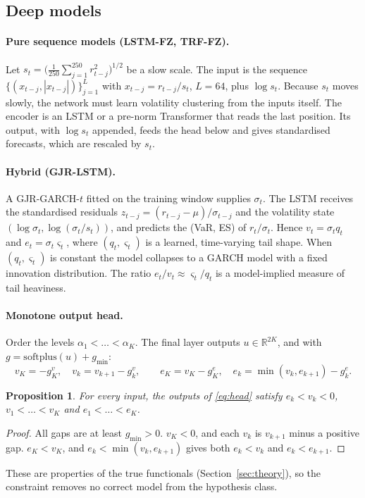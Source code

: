 \documentclass[11pt]{article}
\newtheorem{proposition}{Proposition}
\theoremstyle{remark}
\newcommand{\1}{\mathbf{1}}
\begin{document}
\subsection{Deep models}\label{sec:deep}
\paragraph{Pure sequence models (LSTM-FZ, TRF-FZ).} Let $s_t=\bigl(\frac{1}{250}\sum_{j=1}^{250}r_{t-j}^2\bigr)^{1/2}$ be a slow scale. The input is the sequence $\{(x_{t-j},|x_{t-j}|)\}_{j=1}^{L}$ with $x_{t-j}=r_{t-j}/s_t$, $L=64$, plus $\log s_t$. Because $s_t$ moves slowly, the network must learn volatility clustering from the inputs itself. The encoder is an LSTM \citep{hochreiter1997long} or a pre-norm Transformer \citep{vaswani2017attention} that reads the last position. Its output, with $\log s_t$ appended, feeds the head below and gives standardised forecasts, which are rescaled by $s_t$.

\paragraph{Hybrid (GJR-LSTM).} A GJR-GARCH-$t$ fitted on the training window supplies $\sigma_t$. The LSTM receives the standardised residuals $z_{t-j}=(r_{t-j}-\mu)/\sigma_{t-j}$ and the volatility state $(\log\sigma_t,\log(\sigma_t/s_t))$, and predicts the (VaR, ES) of $r_t/\sigma_t$. Hence $v_t=\sigma_tq_t$ and $e_t=\sigma_t\varsigma_t$, where $(q_t,\varsigma_t)$ is a learned, time-varying tail shape. When $(q_t,\varsigma_t)$ is constant the model collapses to a GARCH model with a fixed innovation distribution. The ratio $e_t/v_t\approx\varsigma_t/q_t$ is a model-implied measure of tail heaviness.

\paragraph{Monotone output head.} Order the levels $\alpha_1<\dots<\alpha_K$. The final layer outputs $u\in\mathbb{R}^{2K}$, and with $g=\mathrm{softplus}(u)+g_{\min}$:
\begin{equation}\label{eq:head}
v_K=-g^v_K,\quad v_k=v_{k+1}-g^v_k,\qquad e_K=v_K-g^e_K,\quad e_k=\min(v_k,e_{k+1})-g^e_k .
\end{equation}
\begin{proposition}\label{prop:head}
For every input, the outputs of \eqref{eq:head} satisfy $e_k<v_k<0$, $v_1<\dots<v_K$ and $e_1<\dots<e_K$.
\end{proposition}
\begin{proof}
All gaps are at least $g_{\min}>0$. $v_K<0$, and each $v_k$ is $v_{k+1}$ minus a positive gap. $e_K<v_K$, and $e_k<\min(v_k,e_{k+1})$ gives both $e_k<v_k$ and $e_k<e_{k+1}$.
\end{proof}
These are properties of the true functionals (Section~\ref{sec:theory}), so the constraint removes no correct model from the hypothesis class.
\end{document}
